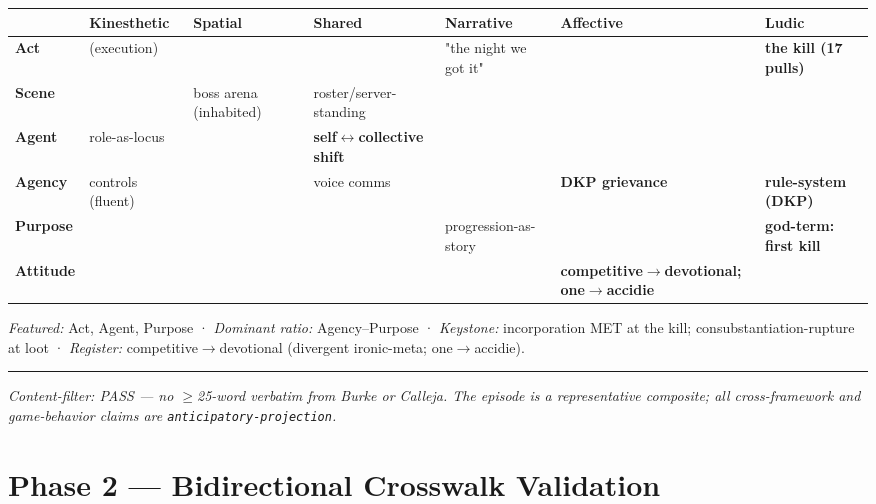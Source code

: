 \documentclass[11pt]{report}
\begin{document}
\begin{table}[H]
\scriptsize
\setlength{\tabcolsep}{3pt}
\renewcommand{\arraystretch}{1.25}
\begin{tabularx}{\textwidth}{>{\RaggedRight\arraybackslash}X>{\RaggedRight\arraybackslash}X>{\RaggedRight\arraybackslash}X>{\RaggedRight\arraybackslash}X>{\RaggedRight\arraybackslash}X>{\RaggedRight\arraybackslash}X>{\RaggedRight\arraybackslash}X}
\toprule
 & Kinesthetic & Spatial & Shared & Narrative & Affective & Ludic \\
\midrule
\textbf{Act} & (execution) &  &  & "the night we got it" &  & \textbf{the kill (17 pulls)} \\
\textbf{Scene} &  & boss arena (inhabited) & roster/server-standing &  &  &  \\
\textbf{Agent} & role-as-locus &  & \textbf{self$\leftrightarrow$\allowbreak collective shift} &  &  &  \\
\textbf{Agency} & controls (fluent) &  & voice comms &  & \textbf{DKP grievance} & \textbf{rule-system (DKP)} \\
\textbf{Purpose} &  &  &  & progression-as-story &  & \textbf{god-term: first kill} \\
\textbf{Attitude} &  &  &  &  & \textbf{competitive$\rightarrow$\allowbreak devotional; one$\rightarrow$\allowbreak accidie} &  \\
\bottomrule
\end{tabularx}
\end{table}


\textit{Featured:} Act, Agent, Purpose · \textit{Dominant ratio:} Agency–Purpose · \textit{Keystone:} incorporation MET at the kill; consubstantiation-rupture at loot · \textit{Register:} competitive$\rightarrow$\allowbreak devotional (divergent ironic-meta; one$\rightarrow$\allowbreak accidie).


\vspace{0.4em}\hrule\vspace{0.8em}


\textit{Content-filter: PASS — no $\geq$25-word verbatim from Burke or Calleja. The episode is a representative composite; all cross-framework and game-behavior claims are \texttt{anticipatory-\discretionary{}{}{}projection}.}


\clearpage
\appendix
\renewcommand{\thesection}{\Alph{section}}
\section{Phase 2 — Bidirectional Crosswalk Validation}
\end{document}

